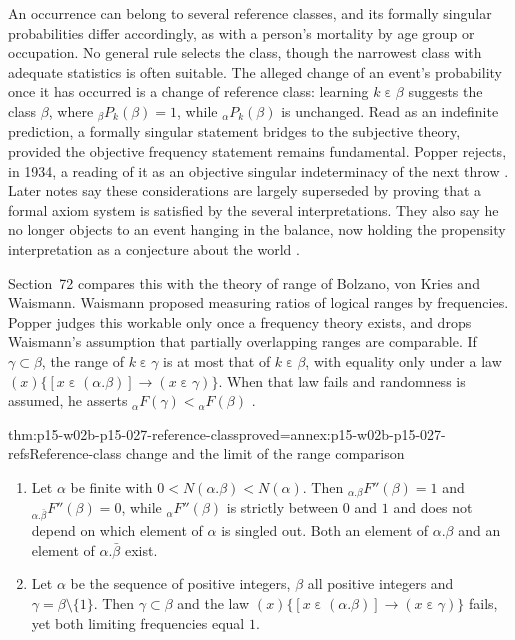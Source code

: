 An occurrence can belong to several reference classes, and its formally
singular probabilities differ accordingly, as with a person's mortality
by age group or occupation. No general rule selects the class, though
the narrowest class with adequate statistics is often suitable. The
alleged change of an event's probability once it has occurred is a
change of reference class: learning \(k\mathrel{\varepsilon}\beta\) suggests the class
\(\beta\), where \({}_{\beta}P_k(\beta)=1\), while \({}_{\alpha}P_k(\beta)\)
is unchanged. Read as an indefinite prediction, a formally singular
statement bridges to the subjective theory, provided the objective
frequency statement remains fundamental. Popper rejects, in 1934, a
reading of it as an objective singular indeterminacy of the next throw
\parencite[\S71]{Popper2002LogicDiscoveryUI}. Later notes say these
considerations are largely superseded by proving that a formal axiom
system is satisfied by the several interpretations. They also say he no
longer objects to an event hanging in the balance, now holding the
propensity interpretation as a conjecture about the world
\parencite[\S71, notes~*2--*4]{Popper2002LogicDiscoveryUI}.

Section~72 compares this with the theory of range of Bolzano, von Kries
and Waismann. Waismann proposed measuring ratios of logical ranges by
frequencies. Popper judges this workable only once a frequency theory
exists, and drops Waismann's assumption that partially overlapping ranges
are comparable. If \(\gamma\subset\beta\), the range of
\(k\mathrel{\varepsilon}\gamma\) is at most that of
\(k\mathrel{\varepsilon}\beta\), with equality only under a law
\((x)\{[x\mathrel{\varepsilon}(\alpha.\beta)]\to(x\mathrel{\varepsilon}\gamma)\}\). When that law fails and randomness is
assumed, he asserts \({}_{\alpha}F(\gamma)<{}_{\alpha}F(\beta)\)
\parencite[\S72]{Popper2002LogicDiscoveryUI}.

\begin{hbtheorem}{thm:p15-w02b-p15-027-reference-class}{proved=annex:p15-w02b-p15-027-refs}{Reference-class change and the limit of the range comparison}
\begin{enumerate}
\item Let \(\alpha\) be finite with \(0<N(\alpha.\beta)<N(\alpha)\). Then
  \({}_{\alpha.\beta}F''(\beta)=1\) and
  \({}_{\alpha.\bar\beta}F''(\beta)=0\), while \({}_{\alpha}F''(\beta)\) is
  strictly between \(0\) and \(1\) and does not depend on which element
  of \(\alpha\) is singled out. Both an element of \(\alpha.\beta\) and
  an element of \(\alpha.\bar\beta\) exist.
\item Let \(\alpha\) be the sequence of positive integers, \(\beta\) all
  positive integers and \(\gamma=\beta\setminus\{1\}\). Then
  \(\gamma\subset\beta\) and the law
  \((x)\{[x\mathrel{\varepsilon}(\alpha.\beta)]\to(x\mathrel{\varepsilon}\gamma)\}\) fails, yet both limiting
  frequencies equal \(1\).
\end{enumerate}
\end{hbtheorem}

